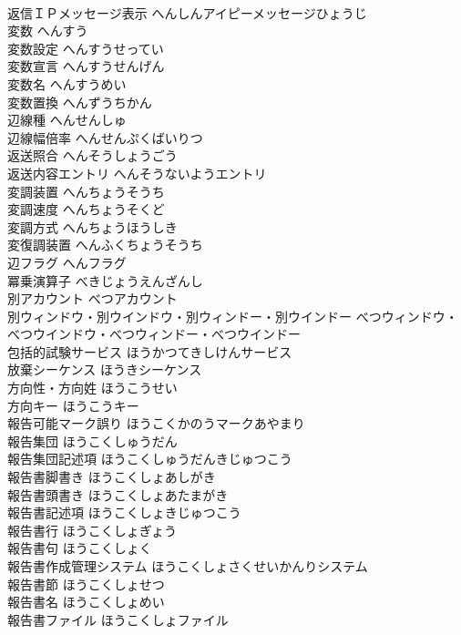 \documentclass[8pt]{extreport}
\begin{document}
\begin{CJK}{UTF8}{min}
\\	返信ＩＰメッセージ表示	へんしんアイピーメッセージひょうじ	
\\	変数	へんすう	
\\	変数設定	へんすうせってい	
\\	変数宣言	へんすうせんげん	
\\	変数名	へんすうめい	
\\	変数置換	へんずうちかん	
\\	辺線種	へんせんしゅ	
\\	辺線幅倍率	へんせんぷくばいりつ	
\\	返送照合	へんそうしょうごう	
\\	返送内容エントリ	へんそうないようエントリ	
\\	変調装置	へんちょうそうち	
\\	変調速度	へんちょうそくど	
\\	変調方式	へんちょうほうしき	
\\	変復調装置	へんふくちょうそうち	
\\	辺フラグ	へんフラグ	
\\	冪乗演算子	べきじょうえんざんし	
\\	別アカウント	べつアカウント	
\\	別ウィンドウ・別ウインドウ・別ウィンドー・別ウインドー	べつウィンドウ・べつウインドウ・べつウィンドー・べつウインドー	
\\	包括的試験サービス	ほうかつてきしけんサービス	
\\	放棄シーケンス	ほうきシーケンス	
\\	方向性・方向姓	ほうこうせい	
\\	方向キー	ほうこうキー	
\\	報告可能マーク誤り	ほうこくかのうマークあやまり	
\\	報告集団	ほうこくしゅうだん	
\\	報告集団記述項	ほうこくしゅうだんきじゅつこう	
\\	報告書脚書き	ほうこくしょあしがき	
\\	報告書頭書き	ほうこくしょあたまがき	
\\	報告書記述項	ほうこくしょきじゅつこう	
\\	報告書行	ほうこくしょぎょう	
\\	報告書句	ほうこくしょく	
\\	報告書作成管理システム	ほうこくしょさくせいかんりシステム	
\\	報告書節	ほうこくしょせつ	
\\	報告書名	ほうこくしょめい	
\\	報告書ファイル	ほうこくしょファイル	

\end{CJK}
\end{document}
